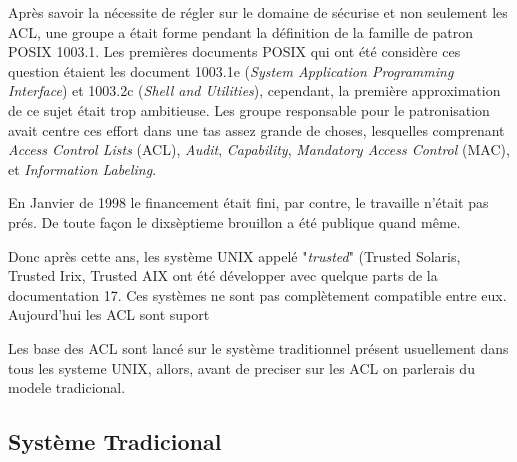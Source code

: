 \documentclass[draft]{article}
\begin{document}
Après savoir la nécessite de régler sur le domaine de sécurise et non seulement les ACL, une groupe a était forme pendant la définition de la famille de patron POSIX 1003.1. Les premières documents POSIX qui ont été considère ces question étaient les document 1003.1e (\emph{System Application Programming Interface}) et 1003.2c (\emph{Shell and Utilities}), cependant, la première approximation de ce sujet était trop ambitieuse. Les groupe responsable pour le patronisation avait centre ces effort dans une tas assez grande de choses, lesquelles  comprenant \emph{Access Control Lists} (ACL), \emph{Audit}, \emph{Capability},\emph{ Mandatory Access Control }(MAC), et \emph{Information Labeling}\cite{aclsuse}.

En Janvier de 1998\cite{aclsuse} le financement était fini, par contre, le travaille n'était pas prés. De toute façon le dixsèptieme brouillon a été publique quand même\cite{posix17}.

Donc après cette ans, les système UNIX appelé "\emph{trusted}" (Trusted Solaris, Trusted Irix, Trusted AIX ont été développer avec quelque parts de la documentation 17. Ces systèmes ne sont pas complètement compatible entre eux. Aujourd'hui les ACL sont suport



Les base des ACL sont lancé sur le système traditionnel présent usuellement dans tous les systeme UNIX, allors, avant de preciser sur les ACL on parlerais du modele tradicional.

\subsection*{Système Tradicional}
\end{document}
